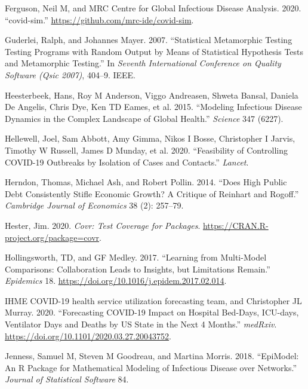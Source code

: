 \documentclass[
]{article}
\begin{document}
\leavevmode\hypertarget{ref-ferg_github}{}%
Ferguson, Neil M, and MRC Centre for Global Infectious Disease Analysis. 2020. ``covid-sim.'' \url{https://github.com/mrc-ide/covid-sim}.

\leavevmode\hypertarget{ref-guderlei2007statistical}{}%
Guderlei, Ralph, and Johannes Mayer. 2007. ``Statistical Metamorphic Testing Testing Programs with Random Output by Means of Statistical Hypothesis Tests and Metamorphic Testing.'' In \emph{Seventh International Conference on Quality Software (Qsic 2007)}, 404--9. IEEE.

\leavevmode\hypertarget{ref-heesterbeek2015modeling}{}%
Heesterbeek, Hans, Roy M Anderson, Viggo Andreasen, Shweta Bansal, Daniela De Angelis, Chris Dye, Ken TD Eames, et al. 2015. ``Modeling Infectious Disease Dynamics in the Complex Landscape of Global Health.'' \emph{Science} 347 (6227).

\leavevmode\hypertarget{ref-hellewell2020feasibility}{}%
Hellewell, Joel, Sam Abbott, Amy Gimma, Nikos I Bosse, Christopher I Jarvis, Timothy W Russell, James D Munday, et al. 2020. ``Feasibility of Controlling COVID-19 Outbreaks by Isolation of Cases and Contacts.'' \emph{Lancet}.

\leavevmode\hypertarget{ref-herndon2014does}{}%
Herndon, Thomas, Michael Ash, and Robert Pollin. 2014. ``Does High Public Debt Consistently Stifle Economic Growth? A Critique of Reinhart and Rogoff.'' \emph{Cambridge Journal of Economics} 38 (2): 257--79.

\leavevmode\hypertarget{ref-covr}{}%
Hester, Jim. 2020. \emph{Covr: Test Coverage for Packages}. \url{https://CRAN.R-project.org/package=covr}.

\leavevmode\hypertarget{ref-hollingsworth2017learning}{}%
Hollingsworth, TD, and GF Medley. 2017. ``Learning from Multi-Model Comparisons: Collaboration Leads to Insights, but Limitations Remain.'' \emph{Epidemics} 18. \url{https://doi.org/10.1016/j.epidem.2017.02.014}.

\leavevmode\hypertarget{ref-ihme}{}%
IHME COVID-19 health service utilization forecasting team, and Christopher JL Murray. 2020. ``Forecasting COVID-19 Impact on Hospital Bed-Days, ICU-days, Ventilator Days and Deaths by US State in the Next 4 Months.'' \emph{medRxiv}. \url{https://doi.org/10.1101/2020.03.27.20043752}.

\leavevmode\hypertarget{ref-jenness2018epimodel}{}%
Jenness, Samuel M, Steven M Goodreau, and Martina Morris. 2018. ``EpiModel: An R Package for Mathematical Modeling of Infectious Disease over Networks.'' \emph{Journal of Statistical Software} 84.
\end{document}
